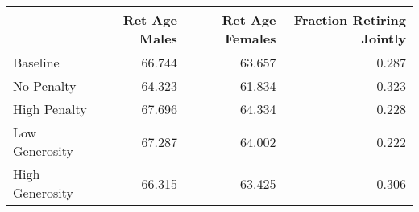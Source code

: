 \begin{tabular}{lrrr}
\toprule
{} & Ret Age Males & Ret Age Females & Fraction Retiring Jointly \\
\midrule
Baseline        &        66.744 &          63.657 &                     0.287 \\
No Penalty      &        64.323 &          61.834 &                     0.323 \\
High Penalty    &        67.696 &          64.334 &                     0.228 \\
Low Generosity  &        67.287 &          64.002 &                     0.222 \\
High Generosity &        66.315 &          63.425 &                     0.306 \\
\bottomrule
\end{tabular}
